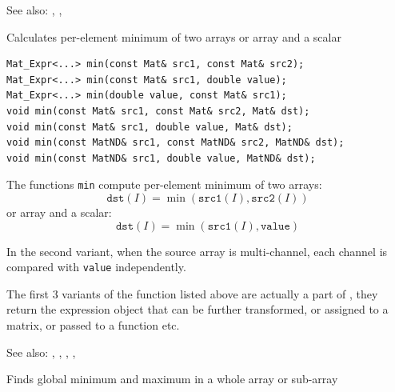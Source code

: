See also: , , 

\label{min}
Calculates per-element minimum of two arrays or array and a scalar

\begin{lstlisting}
Mat_Expr<...> min(const Mat& src1, const Mat& src2);
Mat_Expr<...> min(const Mat& src1, double value);
Mat_Expr<...> min(double value, const Mat& src1);
void min(const Mat& src1, const Mat& src2, Mat& dst);
void min(const Mat& src1, double value, Mat& dst);
void min(const MatND& src1, const MatND& src2, MatND& dst);
void min(const MatND& src1, double value, MatND& dst);
\end{lstlisting}
\begin{description}
\end{description}

The functions \texttt{min} compute per-element minimum of two arrays:
\[\texttt{dst}(I)=\min(\texttt{src1}(I), \texttt{src2}(I))\]
or array and a scalar:
\[\texttt{dst}(I)=\min(\texttt{src1}(I), \texttt{value})\]

In the second variant, when the source array is multi-channel, each channel is compared with \texttt{value} independently.

The first 3 variants of the function listed above are actually a part of , they return the expression object that can be further transformed, or assigned to a matrix, or passed to a function etc.

See also: , , , , 

\label{minMaxLoc}
Finds global minimum and maximum in a whole array or sub-array

